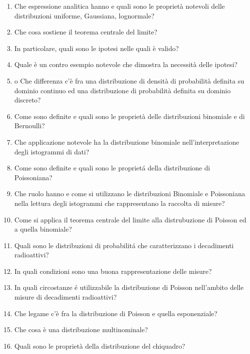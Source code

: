 \begin{enumerate}
	\item Che espressione analitica hanno e quali sono le proprietà notevoli delle distribuzioni uniforme, Gaussiana, lognormale?
	\item Che cosa sostiene il teorema centrale del limite?
	\item In particolare, quali sono le ipotesi nelle quali è valido?
	\item Quale è un contro esempio notevole che dimostra la necessità delle ipotesi?
	\item o	Che differenza c'è fra una distribuzione di densità di probabilità definita su dominio continuo ed una distribuzione di probabilità definita su dominio discreto?
	\item Come sono definite e quali sono le proprietà delle distribuzioni binomiale e di Bernoulli?
	\item Che applicazione notevole ha la distribuzione binomiale nell'interpretazione degli istogrammi di dati?
	\item Come sono definite e quali sono le propriet\'{a} della distribuzione di Poissoniana?
	\item Che ruolo hanno e come si utilizzano le distribuzioni Binomiale e Poissoniana nella lettura degli istogrammi che rappresentano la raccolta di misure?
	\item Come si applica il teorema centrale del limite alla distrubuzione di Poisson ed a quella binomiale?
	\item Quali sono le distribuzioni di probabilit\'{a} che caratterizzano i decadimenti radioattivi?
	\item In quali condizioni sono una buona rappresentazione delle misure?
	\item In quali circostanze \'{e} utilizzabile la distribuzione di Poisson nell'ambito delle misure di decadimenti radioattivi?
	\item Che legame c'\`{e} fra la distribuzione di Poisson e quella esponenziale?
	\item Che cosa \`{e} una distribuzione multinominale?
	\item Quali sono le propriet\`{a} della distribuzione del chiquadro?
\end{enumerate}

